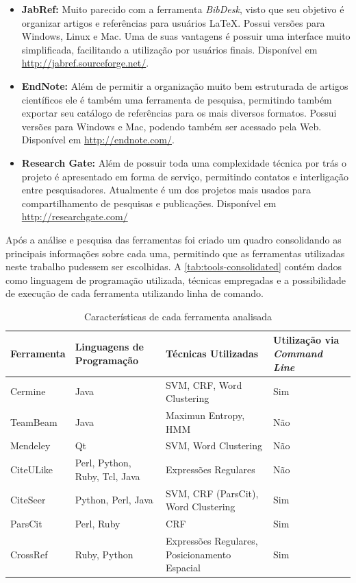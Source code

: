 \begin{itemize}
    \item \textbf{JabRef:} Muito parecido com a ferramenta \emph{BibDesk}, visto que seu objetivo é organizar artigos e referências para usuários \LaTeX. Possui versões para Windows, Linux e Mac. Uma de suas vantagens é possuir uma interface muito simplificada, facilitando a utilização por usuários finais. Disponível em \url{http://jabref.sourceforge.net/}.

    \item \textbf{EndNote:} Além de permitir a organização muito bem estruturada de artigos científicos ele é também uma ferramenta de pesquisa, permitindo também exportar seu catálogo de referências para os mais diversos formatos. Possui versões para Windows e Mac, podendo também ser acessado pela Web. Disponível em \url{http://endnote.com/}.

    \item \textbf{Research Gate:} Além de possuir toda uma complexidade técnica por trás o projeto é apresentado em forma de serviço, permitindo contatos e interligação entre pesquisadores. Atualmente é um dos projetos mais usados para compartilhamento de pesquisas e publicações. Disponível em \url{http://researchgate.com/}

\end{itemize}

Após a análise e pesquisa das ferramentas foi criado um quadro consolidando as principais informações sobre cada uma, permitindo que as ferramentas utilizadas neste trabalho pudessem ser escolhidas. A \autoref{tab:tools-consolidated} contém dados como linguagem de programação utilizada, técnicas empregadas e a possibilidade de execução de cada ferramenta utilizando linha de comando.

\begin{table}[h!]
    \caption{Características de cada ferramenta analisada}
    \begin{center}
        \begin{tabular}{|C{3cm}|C{3cm}|C{3cm}|C{4cm}|}
            \hline 
            \textbf{Ferramenta} & \textbf{Linguagens de Programação} & \textbf{Técnicas Utilizadas} & \textbf{Utilização via \emph{Command Line}} \\ 
            \hline 
            Cermine & Java & SVM, CRF, Word Clustering & Sim \\ \hline
            TeamBeam & Java & Maximun Entropy, HMM & Não \\ \hline
            Mendeley & Qt & SVM, Word Clustering & Não \\ \hline
            CiteULike & Perl, Python, Ruby, Tcl, Java & Expressões Regulares & Não \\ \hline
            CiteSeer & Python, Perl, Java & SVM, CRF (ParsCit), Word Clustering & Sim \\ \hline
            ParsCit & Perl, Ruby & CRF & Sim \\ \hline
            CrossRef & Ruby, Python & Expressões Regulares, Posicionamento Espacial  & Sim \\ \hline
        \end{tabular}
    \end{center}
    \label{tab:tools-consolidated}
\end{table}


